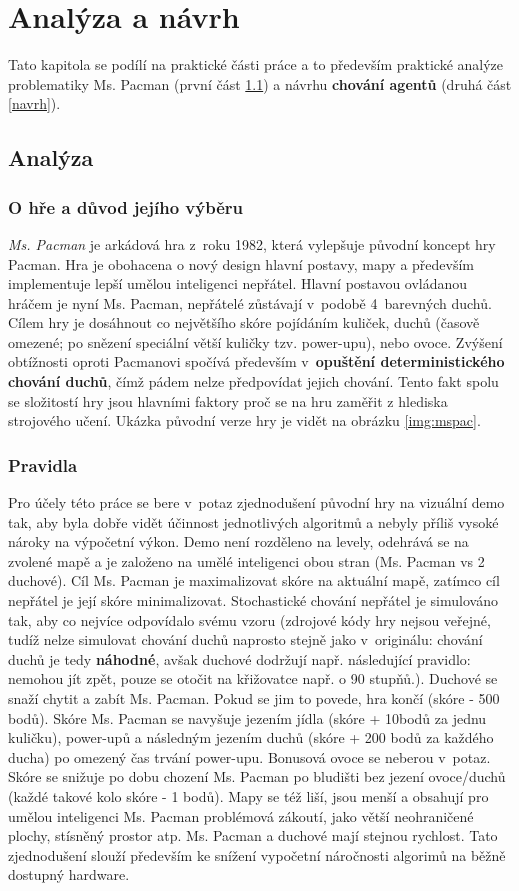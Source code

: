 \chapter{Analýza a návrh}
Tato kapitola se podílí na praktické části práce a to především praktické analýze problematiky Ms. Pacman (první část \ref{analyza}) a návrhu \textbf{chování agentů} (druhá část \ref{navrh}).

\section{Analýza}
\label{analyza}
\subsection*{O hře a důvod jejího výběru}
\textit{Ms. Pacman} je arkádová hra z roku 1982, která vylepšuje původní koncept hry Pacman. Hra je obohacena o nový design hlavní postavy, mapy a především implementuje lepší umělou inteligenci nepřátel. Hlavní postavou ovládanou hráčem je nyní Ms. Pacman, nepřátelé zůstávají v podobě 4 barevných duchů. Cílem hry je dosáhnout co největšího skóre pojídáním kuliček, duchů (časově omezené; po snězení speciální větší kuličky tzv. power-upu), nebo ovoce.
Zvýšení obtížnosti oproti Pacmanovi spočívá především v \textbf{opuštění deterministického chování duchů}, čímž pádem nelze předpovídat jejich chování. Tento fakt spolu se složitostí hry jsou hlavními faktory proč se na hru zaměřit z hlediska strojového učení. Ukázka původní verze hry je vidět na obrázku \ref{img:mspac}.

\subsection*{Pravidla}
Pro účely této práce se bere v potaz zjednodušení původní hry na vizuální demo tak, aby byla dobře vidět účinnost jednotlivých algoritmů a nebyly příliš vysoké nároky na výpočetní výkon. Demo není rozděleno na levely, odehrává se na zvolené mapě a je založeno na umělé inteligenci obou stran (Ms. Pacman vs 2 duchové). Cíl Ms. Pacman je maximalizovat skóre na aktuální mapě, zatímco cíl nepřátel je její skóre minimalizovat. Stochastické chování nepřátel je simulováno tak, aby co nejvíce odpovídalo svému vzoru (zdrojové kódy hry nejsou veřejné, tudíž nelze simulovat chování duchů naprosto stejně jako v originálu: chování duchů je tedy \textbf{náhodné}, avšak duchové dodržují např. následující pravidlo: nemohou jít zpět, pouze se otočit na křižovatce např. o 90 stupňů.). Duchové se snaží chytit a zabít Ms. Pacman. Pokud se jim to povede, hra končí (skóre - 500 bodů). Skóre Ms. Pacman se navyšuje jezením jídla (skóre + 10bodů za jednu kuličku), power-upů a následným jezením duchů (skóre + 200 bodů za každého ducha) po omezený čas trvání power-upu. Bonusová ovoce se neberou v potaz. Skóre se snižuje po dobu chození Ms. Pacman po bludišti bez jezení ovoce/duchů (každé takové kolo skóre - 1 bodů). Mapy se též liší, jsou menší a obsahují pro umělou inteligenci Ms. Pacman problémová zákoutí, jako větší neohraničené plochy, stísněný prostor atp. Ms. Pacman a duchové mají stejnou rychlost. Tato zjednodušení slouží především ke snížení vypočetní náročnosti algorimů na běžně dostupný hardware.

